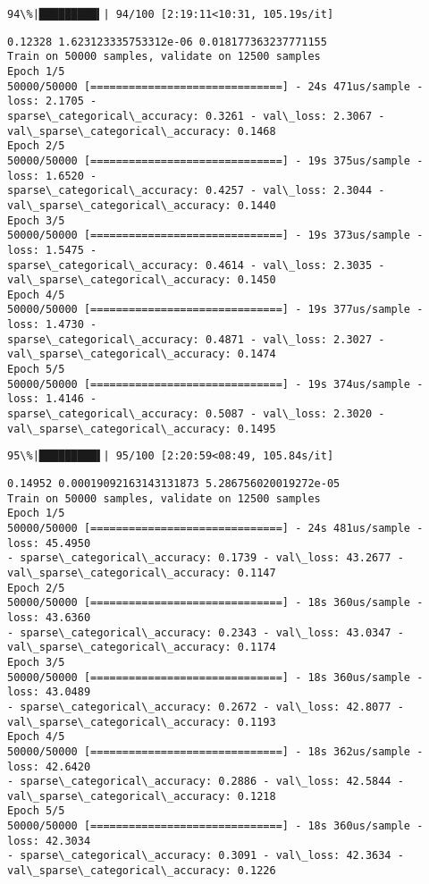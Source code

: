 \documentclass[11pt]{article}
\begin{document}
    \begin{Verbatim}[commandchars=\\\{\}]
 94\%|█████████▍| 94/100 [2:19:11<10:31, 105.19s/it]
    \end{Verbatim}

    \begin{Verbatim}[commandchars=\\\{\}]
0.12328 1.623123335753312e-06 0.018177363237771155
Train on 50000 samples, validate on 12500 samples
Epoch 1/5
50000/50000 [==============================] - 24s 471us/sample - loss: 2.1705 -
sparse\_categorical\_accuracy: 0.3261 - val\_loss: 2.3067 -
val\_sparse\_categorical\_accuracy: 0.1468
Epoch 2/5
50000/50000 [==============================] - 19s 375us/sample - loss: 1.6520 -
sparse\_categorical\_accuracy: 0.4257 - val\_loss: 2.3044 -
val\_sparse\_categorical\_accuracy: 0.1440
Epoch 3/5
50000/50000 [==============================] - 19s 373us/sample - loss: 1.5475 -
sparse\_categorical\_accuracy: 0.4614 - val\_loss: 2.3035 -
val\_sparse\_categorical\_accuracy: 0.1450
Epoch 4/5
50000/50000 [==============================] - 19s 377us/sample - loss: 1.4730 -
sparse\_categorical\_accuracy: 0.4871 - val\_loss: 2.3027 -
val\_sparse\_categorical\_accuracy: 0.1474
Epoch 5/5
50000/50000 [==============================] - 19s 374us/sample - loss: 1.4146 -
sparse\_categorical\_accuracy: 0.5087 - val\_loss: 2.3020 -
val\_sparse\_categorical\_accuracy: 0.1495
    \end{Verbatim}

    \begin{Verbatim}[commandchars=\\\{\}]
 95\%|█████████▌| 95/100 [2:20:59<08:49, 105.84s/it]
    \end{Verbatim}

    \begin{Verbatim}[commandchars=\\\{\}]
0.14952 0.00019092163143131873 5.286756020019272e-05
Train on 50000 samples, validate on 12500 samples
Epoch 1/5
50000/50000 [==============================] - 24s 481us/sample - loss: 45.4950
- sparse\_categorical\_accuracy: 0.1739 - val\_loss: 43.2677 -
val\_sparse\_categorical\_accuracy: 0.1147
Epoch 2/5
50000/50000 [==============================] - 18s 360us/sample - loss: 43.6360
- sparse\_categorical\_accuracy: 0.2343 - val\_loss: 43.0347 -
val\_sparse\_categorical\_accuracy: 0.1174
Epoch 3/5
50000/50000 [==============================] - 18s 360us/sample - loss: 43.0489
- sparse\_categorical\_accuracy: 0.2672 - val\_loss: 42.8077 -
val\_sparse\_categorical\_accuracy: 0.1193
Epoch 4/5
50000/50000 [==============================] - 18s 362us/sample - loss: 42.6420
- sparse\_categorical\_accuracy: 0.2886 - val\_loss: 42.5844 -
val\_sparse\_categorical\_accuracy: 0.1218
Epoch 5/5
50000/50000 [==============================] - 18s 360us/sample - loss: 42.3034
- sparse\_categorical\_accuracy: 0.3091 - val\_loss: 42.3634 -
val\_sparse\_categorical\_accuracy: 0.1226
    \end{Verbatim}
\end{document}
